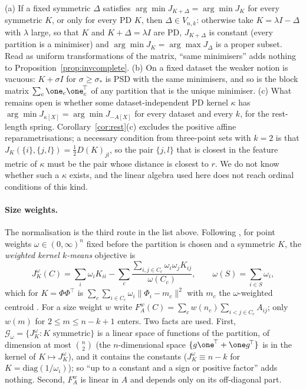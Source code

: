 \begin{remark}\label{rem:argmin}
(a) If a fixed symmetric $\Delta$ satisfies $\arg\min J_{K+\Delta}=\arg\min J_K$ for every symmetric $K$, or only for every PD $K$, then $\Delta\in V_{n,k}$: otherwise take $K=\lambda I-\Delta$ with $\lambda$ large, so that $K$ and $K+\Delta=\lambda I$ are PD, $J_{K+\Delta}$ is constant (every partition is a minimiser) and $\arg\min J_K=\arg\max J_\Delta$ is a proper subset. Read as uniform transformations of the matrix, ``same minimisers'' adds nothing to Proposition~\ref{prop:invcomplete}.  (b) On a fixed dataset the weaker notion is vacuous: $K+\sigma I$ for $\sigma\ge\sigma_*$ is PSD with the same minimisers, and so is the block matrix $\sum_c\one_c\one_c^{\!\top}$ of any partition that is the unique minimiser. (c) What remains open is whether some dataset-independent PD kernel $\kappa$ has $\arg\min J_{\kappa[X]}=\arg\min J_{-A[X]}$ for every dataset and every $k$, for the rest-length spring. Corollary~\ref{cor:rest}(c) excludes the positive affine reparametrisations; a necessary condition from three-point sets with $k=2$ is that $J_K(\{i\},\{j,l\})=\tfrac12D(K)_{jl}$, so the pair $\{j,l\}$ that is closest in the feature metric of $\kappa$ must be the pair whose distance is closest to $r$. We do not know whether such a $\kappa$ exists, and the linear algebra used here does not reach ordinal conditions of this kind.
\end{remark}

\paragraph{Size weights.} The normalisation is the third route in the list above. Following \citet{dhillon2004,dhillon2007}, for point weights $\omega\in(0,\infty)^n$ fixed before the partition is chosen and a symmetric $K$, the \emph{weighted kernel $k$-means} objective is
\[
J^\omega_K(C)=\sum_i\omega_iK_{ii}-\sum_c\frac{\sum_{i,j\in C_c}\omega_i\omega_jK_{ij}}{\omega(C_c)},\qquad\omega(S)=\sum_{i\in S}\omega_i,
\]
which for $K=\Phi\Phi^{\!\top}$ is $\sum_c\sum_{i\in C_c}\omega_i\lVert\Phi_i-m_c\rVert^2$ with $m_c$ the $\omega$-weighted centroid . For a size weight $w$ write $F^w_A(C)=\sum_cw(n_c)\sum_{i<j\in C_c}A_{ij}$; only $w(m)$ for $2\le m\le n-k+1$ enters. Two facts are used. First, $\mathcal G_\omega=\{J^\omega_K:K\text{ symmetric}\}$ is a linear space of functions of the partition, of dimension at most $\binom n2$ (the $n$-dimensional space $\{g\one^{\!\top}+\one g^{\!\top}\}$ is in the kernel of $K\mapsto J^\omega_K$), and it contains the constants ($J^\omega_K\equiv n-k$ for $K=\mathrm{diag}(1/\omega_i)$); so ``up to a constant and a sign or positive factor'' adds nothing. Second, $F^w_A$ is linear in $A$ and depends only on its off-diagonal part.


